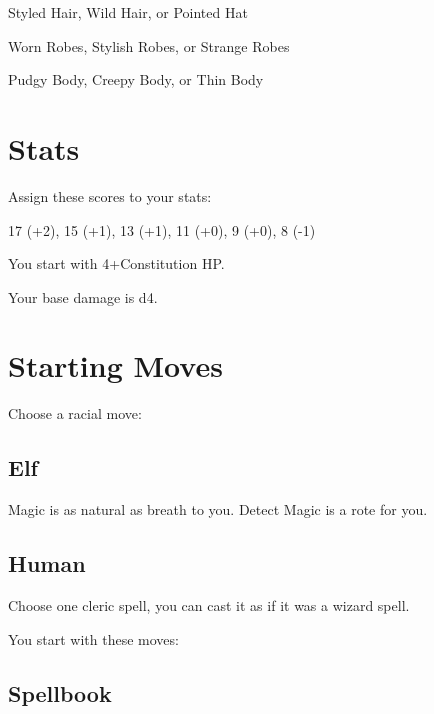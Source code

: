  

Styled Hair, Wild Hair, or Pointed Hat

 

Worn Robes, Stylish Robes, or Strange Robes

 

Pudgy Body, Creepy Body, or Thin Body



 
\section{Stats}   
 



Assign these scores to your stats:

 

17 (+2), 15 (+1), 13 (+1), 11 (+0), 9 (+0), 8 (-1)

 

You start with 4+Constitution HP.



 

Your base damage is d4.

 
\section{Starting Moves}   
 


\startInstructionsAfterHeader
Choose a racial move:
\stopInstructionsAfterHeader
 


\subsection{Elf}   
 

Magic is as natural as breath to you. Detect Magic is a rote for you.

 
\subsection{Human}   
 

Choose one cleric spell, you can cast it as if it was a wizard spell.



 


\startInstructions
You start with these moves:
\stopInstructions
 
\subsection{Spellbook}   
 

